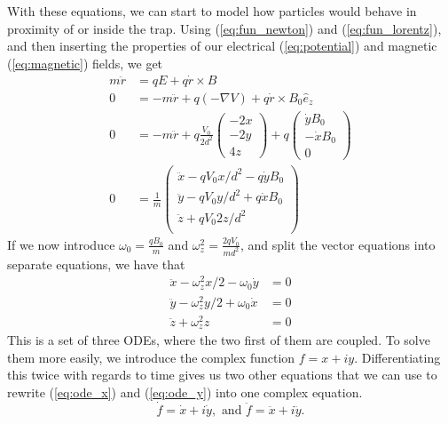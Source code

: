With these equations, we can start to model how particles would behave in proximity of or inside the trap. Using (\ref{eq:fun_newton}) and (\ref{eq:fun_lorentz}), and then inserting the properties of our electrical (\ref{eq:potential}) and magnetic (\ref{eq:magnetic}) fields, we get
%
\begin{align*}
m \ddot r &= qE + q\dot r \times B \\
0 &= - m \ddot r + q(- \nabla V) + q\dot r \times B_0 \hat{e}_z \\
0 &= - m \ddot r + q \frac{V_0}{2d^2} \begin{pmatrix} -2x \\ -2y \\ 4z \end{pmatrix}
          + q \begin{pmatrix} \dot y B_0 \\ -\dot x B_0 \\ 0 \end{pmatrix} \\
0 &= \frac{1}{m}
    \begin{pmatrix} 
        \ddot x - q V_0 x / d^2 - q \dot y B_0 \\
        \ddot y - q V_0 y / d^2 + q \dot x B_0 \\
        \ddot z + q V_0 2z / d^2 \\
    \end{pmatrix}
\end{align*}
%
If we now introduce $\omega_0 = \frac{q B_0}{m}$ and $\omega_z^2 = \frac{2qV_0}{md^2}$, and split the vector equations into separate equations, we have that
%
\begin{align}
\label{eq:ode_x} \ddot x - \omega_z^2 x / 2 - \omega_0 \dot y & = 0 \\
\label{eq:ode_y} \ddot y - \omega_z^2 y / 2 + \omega_0 \dot x &= 0 \\
\label{eq:ode_z} \ddot z + \omega_z^2 z &= 0
\end{align}
%
This is a set of three ODEs, where the two first of them are coupled. To solve them more easily, we introduce the complex function $f = x + i y$. Differentiating this twice with regards to time gives us two other equations that we can use to rewrite (\ref{eq:ode_x}) and (\ref{eq:ode_y}) into one complex equation.
%
\begin{equation*}
\dot f = \dot x + i \dot y, \text{ and } \ddot f = \ddot x + i \ddot y.
\end{equation*}
